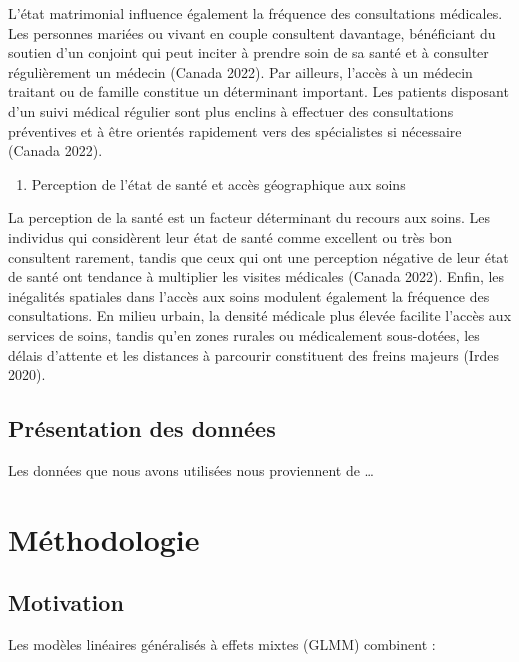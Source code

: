 \documentclass[
]{article}
\providecommand{\tightlist}{%
  \setlength{\itemsep}{0pt}\setlength{\parskip}{0pt}}
\begin{document}
L'état matrimonial influence également la fréquence des consultations
médicales. Les personnes mariées ou vivant en couple consultent
davantage, bénéficiant du soutien d'un conjoint qui peut inciter à
prendre soin de sa santé et à consulter régulièrement un médecin (Canada
2022). Par ailleurs, l'accès à un médecin traitant ou de famille
constitue un déterminant important. Les patients disposant d'un suivi
médical régulier sont plus enclins à effectuer des consultations
préventives et à être orientés rapidement vers des spécialistes si
nécessaire (Canada 2022).

\begin{enumerate}
\def\labelenumi{\arabic{enumi}.}
\setcounter{enumi}{3}
\tightlist
\item
  Perception de l'état de santé et accès géographique aux soins
\end{enumerate}

La perception de la santé est un facteur déterminant du recours aux
soins. Les individus qui considèrent leur état de santé comme excellent
ou très bon consultent rarement, tandis que ceux qui ont une perception
négative de leur état de santé ont tendance à multiplier les visites
médicales (Canada 2022). Enfin, les inégalités spatiales dans l'accès
aux soins modulent également la fréquence des consultations. En milieu
urbain, la densité médicale plus élevée facilite l'accès aux services de
soins, tandis qu'en zones rurales ou médicalement sous-dotées, les
délais d'attente et les distances à parcourir constituent des freins
majeurs (Irdes 2020).

\subsection{Présentation des
données}\label{pruxe9sentation-des-donnuxe9es}

Les données que nous avons utilisées nous proviennent de \ldots{}

\section{Méthodologie}\label{muxe9thodologie}

\subsection{Motivation}\label{motivation}

Les modèles linéaires généralisés à effets mixtes (GLMM) combinent :
\end{document}
